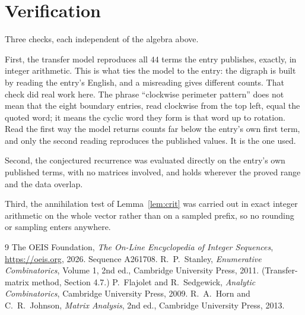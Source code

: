 \documentclass[11pt,a4paper]{article}
\theoremstyle{plain}
\theoremstyle{definition}
\begin{document}
\section{Verification}

Three checks, each independent of the algebra above.

First, the transfer model reproduces all $44$ terms the entry publishes, exactly, in
integer arithmetic. This is what ties the model to the entry: the digraph is built by reading
the entry's English, and a misreading gives different counts. That check did real work here. The phrase ``clockwise perimeter pattern'' does not mean that the eight boundary entries, read clockwise from the top left, equal the quoted word; it means the cyclic word they form is that word up to rotation. Read the first way the model returns counts far below the entry's own first term, and only the second reading reproduces the published values. It is the one used.

Second, the conjectured recurrence was evaluated directly on the entry's own published terms,
with no matrices involved, and holds wherever the proved range and the data overlap.

Third, the annihilation test of Lemma~\ref{lem:crit} was carried out in exact integer
arithmetic on the whole vector rather than on a sampled prefix, so no rounding or sampling
enters anywhere.

\begin{thebibliography}{9}
 The OEIS Foundation, \emph{The On-Line Encyclopedia of Integer
Sequences}, \url{https://oeis.org}, 2026. Sequence A261708.
 R.~P.~Stanley, \emph{Enumerative Combinatorics}, Volume 1, 2nd ed.,
Cambridge University Press, 2011. (Transfer-matrix method, Section 4.7.)
 P.~Flajolet and R.~Sedgewick, \emph{Analytic Combinatorics}, Cambridge
University Press, 2009.
 R.~A.~Horn and C.~R.~Johnson, \emph{Matrix Analysis}, 2nd ed., Cambridge
University Press, 2013.
\end{thebibliography}
\end{document}

